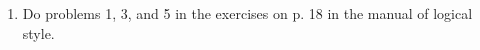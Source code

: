\documentclass[12pt]{article}
\begin{document}
\begin{enumerate}
\begin{comment}
\item  This exercise is related to the verification of the rule of constructive dilemma which I did in class, which is discussed in detail in the 2023 version of the manual of logical style (there is a link to the manual of logical style  on the class page:  the discussion is on pp 28 and 29 of the manual [the first of the two proofs given;  the other proof uses rules we have not discussed yet]).

Verify the rule of {\em destructive dilemma\/}

$$\begin{array}{c}

P \rightarrow R\\

Q \rightarrow S \\

\neg R \vee \neg S \\ \hline

\neg P \vee \neg Q

\end{array}$$

I give you the first few lines

\begin{description}

\item[(1):]  $P \rightarrow R$

\item[(2):]  $Q \rightarrow S$

\item[(3):]  $\neg R \vee \neg S$

\item[Goal:]  $\neg P \vee \neg Q$

\end{description}

Hints:  you could prove this either by cases or by alternative elimination.  If you prove it by alternative elimination, do notice
that the hypothesis will be $\neg\neg P$ not $\neg P$ (and you can get $P$ from this right away).  No matter which way you prove it,
you will definitely want to use the rule of modus tollens one or more times.  This is very similar to the constructive dilemma proof in either case, but just a little more indirect.

\end{comment}

\item  Do problems 1, 3, and 5 in the exercises on p. 18 in the manual of logical style.

\end{enumerate}
\end{document}
